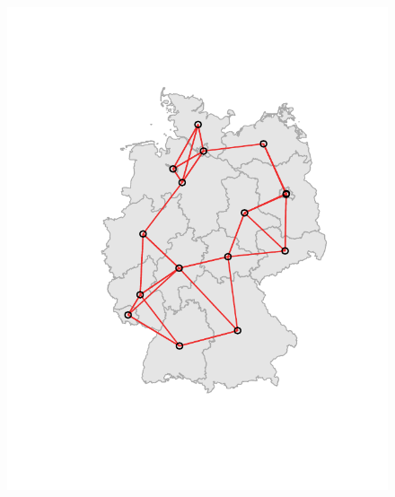 \begin{figure}
    \begin{minipage}[b]{.3\linewidth}
       \includegraphics[width=\linewidth,trim={2cm 3cm 1.7cm 2cm},clip]{body/figures/52-BL_nb_k-3.pdf}
    \end{minipage}
    \hfill
    \begin{minipage}[b]{.3\linewidth}

\end{minipage}
\end{figure}
